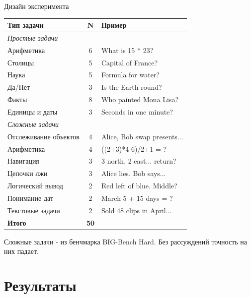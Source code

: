\begin{frame}{Дизайн эксперимента}
    \begin{table}[h]
    \centering
    \footnotesize
    \begin{tabular}{p{3.5cm}cp{4.5cm}}
        \hline
        \textbf{Тип задачи} & \textbf{N} & \textbf{Пример} \\
        \hline
        \multicolumn{3}{l}{\textit{Простые задачи}} \\
        Арифметика & 6 & What is 15 * 23? \\
        Столицы & 5 & Capital of France? \\
        Наука & 5 & Formula for water? \\
        Да/Нет & 3 & Is the Earth round? \\
        Факты & 8 & Who painted Mona Lisa? \\
        Единицы и даты & 3 & Seconds in one minute? \\
        \hline
        \multicolumn{3}{l}{\textit{Сложные задачи}} \\
        Отслеживание объектов & 4 & Alice, Bob swap presents... \\
        Арифметика & 4 & ((2+3)*4-6)/2+1 = ? \\
        Навигация & 3 & 3 north, 2 east... return? \\
        Цепочки лжи & 3 & Alice lies. Bob says... \\
        Логический вывод & 2 & Red left of blue. Middle? \\
        Понимание дат & 2 & March 5 + 15 days = ? \\
        Текстовые задачи & 2 & Sold 48 clips in April... \\
        \hline
        \textbf{Итого} & \textbf{50} & \\
        \hline
    \end{tabular}
    \end{table}
    
    \vspace{0.2cm}
    \small
    Сложные задачи - из бенчмарка BIG-Bench Hard.
    Без рассуждений точность на них падает.
    
\end{frame}

\section{Результаты}

